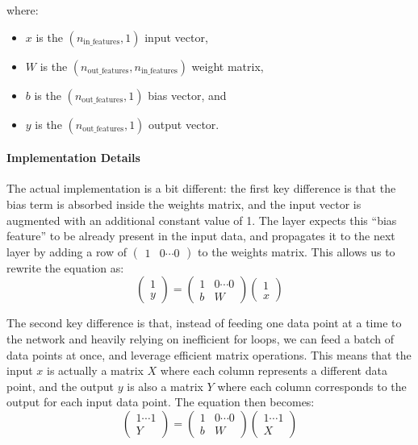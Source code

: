 where:
\begin{itemize}
    \item $x$ is the $(n_{\text{in\_features}}, 1)$ input vector,
    \item $W$ is the $(n_{\text{out\_features}}, n_{\text{in\_features}})$ weight matrix,
    \item $b$ is the $(n_{\text{out\_features}}, 1)$ bias vector, and
    \item $y$ is the $(n_{\text{out\_features}}, 1)$ output vector.
\end{itemize}

\paragraph{Implementation Details} The actual implementation is a bit different: the first key difference is that the bias term is absorbed inside the weights matrix, and the input vector is augmented with an additional constant value of 1. The layer expects this ``bias feature'' to be already present in the input data, and propagates it to the next layer by adding a row of $\begin{pmatrix}1 & 0 \cdots 0\end{pmatrix}$ to the weights matrix. This allows us to rewrite the equation as:
\begin{equation}
    \begin{pmatrix} 1 \\ y \end{pmatrix} = \begin{pmatrix} 1 & 0 \cdots 0 \\ b & W \end{pmatrix} \begin{pmatrix} 1 \\ x \end{pmatrix}
\end{equation}

The second key difference is that, instead of feeding one data point at a time to the network and heavily relying on inefficient for loops, we can feed a batch of data points at once, and leverage efficient matrix operations. This means that the input $x$ is actually a matrix $X$ where each column represents a different data point, and the output $y$ is also a matrix $Y$ where each column corresponds to the output for each input data point. The equation then becomes:
\begin{equation}
    \begin{pmatrix} 1 \cdots 1 \\ Y \end{pmatrix} = \begin{pmatrix} 1 & 0 \cdots 0 \\ b & W \end{pmatrix} \begin{pmatrix} 1 \cdots 1 \\ X \end{pmatrix}
\end{equation}

